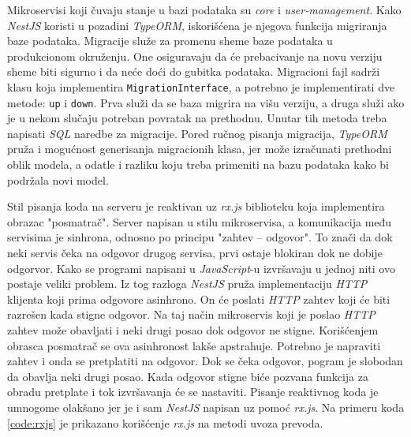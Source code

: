 Mikroservisi koji čuvaju stanje u bazi podataka su \textit{core} i 
\textit{user-management}. Kako \textit{NestJS} koristi u pozadini \textit{TypeORM}, 
iskorišćena je njegova funkcija migriranja baze podataka. Migracije služe 
za promenu sheme baze podataka u produkcionom okruženju. One osiguravaju da 
će prebacivanje na novu verziju sheme biti sigurno i da neće doći do gubitka 
podataka. Migracioni fajl sadrži klasu koja implementira 
\texttt{MigrationInterface}, a potrebno je implementirati dve metode: 
\texttt{up} i \texttt{down}. Prva služi da se baza migrira na višu 
verziju, a druga služi ako je u nekom slučaju potreban povratak na prethodnu. 
Unutar tih metoda treba napisati \textit{SQL} naredbe za migracije. Pored 
ručnog pisanja migracija, \textit{TypeORM} pruža i mogućnost generisanja 
migracionih klasa, jer može izračunati prethodni oblik modela, a odatle i 
razliku koju treba primeniti na bazu podataka kako bi podržala novi model. 

Stil pisanja koda na serveru je reaktivan uz \textit{rx.js} biblioteku koja
implementira obrazac "posmatrač". Server napisan u stilu mikroservisa,
a komunikacija među servisima je sinhrona, odnosno po principu 
"zahtev -- odgovor". To znači da dok neki servis čeka na odgovor drugog 
servisa, prvi ostaje blokiran dok ne dobije odgorvor. Kako se programi napisani 
u \textit{JavaScript}-u izvršavaju u jednoj niti ovo postaje veliki problem. 
Iz tog razloga \textit{NestJS} pruža implementaciju \textit{HTTP} klijenta 
koji prima odgovore asinhrono. On će poslati \textit{HTTP} zahtev koji će biti razrešen kada 
stigne odgovor. Na taj način mikroservis koji je poslao \textit{HTTP} zahtev 
može obavljati i neki drugi posao dok odgovor ne stigne. Korišćenjem obrasca 
posmatrač se ova asinhronost lakše apstrahuje. Potrebno je napraviti zahtev 
i onda se pretplatiti na odgovor. Dok se čeka odgovor, pogram je slobodan da 
obavlja neki drugi posao. Kada odgovor stigne biće pozvana funkcija 
za obradu pretplate i tok izvršavanja će se nastaviti.
Pisanje reaktivnog koda je umnogome olakšano jer je i sam \textit{NestJS} 
napisan uz pomoć \textit{rx.js}. Na primeru koda \ref{code:rxjs} je prikazano
korišćenje \textit{rx.js} na metodi uvoza prevoda.


